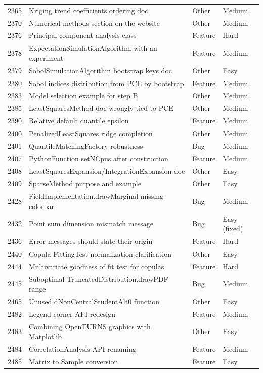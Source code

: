 \documentclass[a4paper,11pt]{article}
\begin{document}
\begin{longtable}{rp{7.6cm}ll}
2365 & Kriging trend coefficients ordering doc & Other & Medium \\
2370 & Numerical methods section on the website & Other & Medium \\
2376 & Principal component analysis class & Feature & Hard \\
2378 & ExpectationSimulationAlgorithm with an experiment & Feature & Medium \\
2379 & SobolSimulationAlgorithm bootstrap keys doc & Other & Easy \\
2380 & Sobol indices distribution from PCE by bootstrap & Feature & Medium \\
2383 & Model selection example for step B & Other & Medium \\
2385 & LeastSquaresMethod doc wrongly tied to PCE & Other & Medium \\
2390 & Relative default quantile epsilon & Feature & Medium \\
2400 & PenalizedLeastSquares ridge completion & Other & Medium \\
2401 & QuantileMatchingFactory robustness & Bug & Medium \\
2407 & PythonFunction setNCpus after construction & Feature & Medium \\
2408 & LeastSquaresExpansion/IntegrationExpansion doc & Other & Easy \\
2409 & SparseMethod purpose and example & Other & Easy \\
2428 & FieldImplementation.drawMarginal missing colorbar & Bug & Medium \\
2432 & Point sum dimension mismatch message & Bug & Easy (fixed) \\
2436 & Error messages should state their origin & Feature & Hard \\
2440 & Copula FittingTest normalization clarification & Other & Easy \\
2444 & Multivariate goodness of fit test for copulas & Feature & Hard \\
2445 & Suboptimal TruncatedDistribution.drawPDF range & Bug & Medium \\
2465 & Unused dNonCentralStudentAlt0 function & Other & Easy \\
2482 & Legend corner API redesign & Feature & Medium \\
2483 & Combining OpenTURNS graphics with Matplotlib & Other & Easy \\
2484 & CorrelationAnalysis API renaming & Feature & Medium \\
2485 & Matrix to Sample conversion & Feature & Easy \\

\end{longtable}
\end{document}
